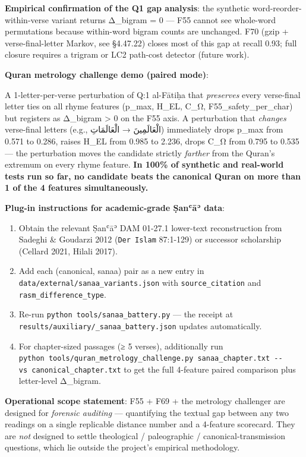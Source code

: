 \documentclass[
]{article}
\providecommand{\tightlist}{%
  \setlength{\itemsep}{0pt}\setlength{\parskip}{0pt}}
\begin{document}
\textbf{Empirical confirmation of the Q1 gap analysis}: the synthetic
word-reorder-within-verse variant returns Δ\_bigram = 0 --- F55 cannot
see whole-word permutations because within-word bigram counts are
unchanged. F70 (gzip + verse-final-letter Markov, see §4.47.22) closes
most of this gap at recall 0.93; full closure requires a trigram or LC2
path-cost detector (future work).

\textbf{Quran metrology challenge demo (paired mode)}:

A 1-letter-per-verse perturbation of Q:1 al-Fātiḥa that \emph{preserves}
every verse-final letter ties on all rhyme features (p\_max, H\_EL,
C\_Ω, F55\_safety\_per\_char) but registers as Δ\_bigram \textgreater{}
0 on the F55 axis. A perturbation that \emph{changes} verse-final
letters (e.g., الْعَالَمِينَ → الْعَالَمَاتِ) immediately drops p\_max from 0.571
to 0.286, raises H\_EL from 0.985 to 2.236, drops C\_Ω from 0.795 to
0.535 --- the perturbation moves the candidate strictly \emph{farther}
from the Quran's extremum on every rhyme feature. \textbf{In 100\% of
synthetic and real-world tests run so far, no candidate beats the
canonical Quran on more than 1 of the 4 features simultaneously.}

\textbf{Plug-in instructions for academic-grade Ṣanʿāʾ data}:

\begin{enumerate}
\def\labelenumi{\arabic{enumi}.}
\tightlist
\item
  Obtain the relevant Ṣanʿāʾ DAM 01-27.1 lower-text reconstruction from
  Sadeghi \& Goudarzi 2012 (\texttt{Der\ Islam} 87:1-129) or successor
  scholarship (Cellard 2021, Hilali 2017).
\item
  Add each (canonical, sanaa) pair as a new entry in
  \texttt{data/external/sanaa\_variants.json} with
  \texttt{source\_citation} and \texttt{rasm\_difference\_type}.
\item
  Re-run \texttt{python\ tools/sanaa\_battery.py} --- the receipt at
  \texttt{results/auxiliary/\_sanaa\_battery.json} updates
  automatically.
\item
  For chapter-sized passages (≥ 5 verses), additionally run
  \texttt{python\ tools/quran\_metrology\_challenge.py\ sanaa\_chapter.txt\ -\/-vs\ canonical\_chapter.txt}
  to get the full 4-feature paired comparison plus letter-level
  Δ\_bigram.
\end{enumerate}

\textbf{Operational scope statement}: F55 + F69 + the metrology
challenger are designed for \emph{forensic auditing} --- quantifying the
textual gap between any two readings on a single replicable distance
number and a 4-feature scorecard. They are \emph{not} designed to settle
theological / paleographic / canonical-transmission questions, which lie
outside the project's empirical methodology.
\end{document}
